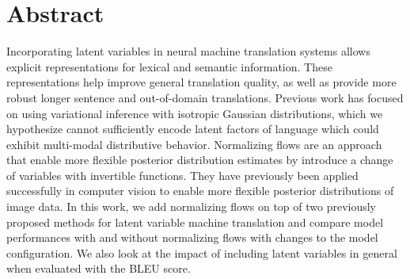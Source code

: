 
\chapter{Abstract}

Incorporating latent variables in neural machine translation systems allows explicit representations for lexical and semantic information. These representations help improve general translation quality, as well as provide more robust longer sentence and out-of-domain translations. Previous work has focused on using variational inference with isotropic Gaussian distributions, which we hypothesize cannot sufficiently encode latent factors of language which could exhibit multi-modal distributive behavior. Normalizing flows are an approach that enable more flexible posterior distribution estimates by introduce a change of variables with invertible functions. They have previously been applied successfully in computer vision to enable more flexible posterior distributions of image data. In this work, we add normalizing flows on top of two previously proposed methods for latent variable machine translation and compare model performances with and without normalizing flows with changes to the model configuration. We also look at the impact of including latent variables in general when evaluated with the BLEU score.   %


